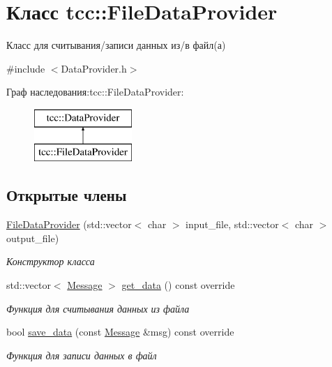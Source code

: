 \hypertarget{classtcc_1_1_file_data_provider}{}\section{Класс tcc\+:\+:File\+Data\+Provider}
\label{classtcc_1_1_file_data_provider}


Класс для считывания/записи данных из/в файл(а)  




{\ttfamily \#include $<$Data\+Provider.\+h$>$}

Граф наследования\+:tcc\+:\+:File\+Data\+Provider\+:\begin{figure}[H]
\begin{center}
\leavevmode
\includegraphics[height=2.000000cm]{classtcc_1_1_file_data_provider}
\end{center}
\end{figure}
\subsection*{Открытые члены}
\begin{DoxyCompactItemize}
\item 
\mbox{\hyperlink{classtcc_1_1_file_data_provider_a86089a313a91640e85c4eb6e221ec357}{File\+Data\+Provider}} (std\+::vector$<$ char $>$ input\+\_\+file, std\+::vector$<$ char $>$ output\+\_\+file)
\begin{DoxyCompactList}\small\item\em Конструктор класса \end{DoxyCompactList}\item 
std\+::vector$<$ \mbox{\hyperlink{classtcc_1_1_message}{Message}} $>$ \mbox{\hyperlink{classtcc_1_1_file_data_provider_ada1c8160929d1b3a2de366bda89ec0b8}{get\+\_\+data}} () const override
\begin{DoxyCompactList}\small\item\em Функция для считывания данных из файла \end{DoxyCompactList}\item 
bool \mbox{\hyperlink{classtcc_1_1_file_data_provider_a969360abf9313a4b81de0af227025fa0}{save\+\_\+data}} (const \mbox{\hyperlink{classtcc_1_1_message}{Message}} \&msg) const override
\begin{DoxyCompactList}\small\item\em Функция для записи данных в файл \end{DoxyCompactList}\end{DoxyCompactItemize}



